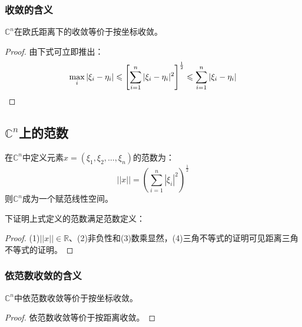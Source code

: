 \subsubsection{收敛的含义}
\begin{theorem}
	$\mathbb{C}^{n}$在欧氏距离下的收敛等价于按坐标收敛。
\end{theorem}
\begin{proof}
	由下式可立即推出：
	\begin{equation*}
		\max_i|\xi_i-\eta_i|\leqslant	\left[\sum_{i=1}^n|\xi_i-\eta_i|^2\right]^{\frac{1}{2}}\leqslant\sum_{i=1}^{n}|\xi_i-\eta_i|\qedhere
	\end{equation*}
\end{proof}

\subsection{$\mathbb{C}^n$上的范数}
\begin{definition}
	在$\mathbb{C}^n$中定义元素$x=(\xi_1,\xi_2,\dots,\xi_n)$的范数为：
	\begin{equation*}
		||x||=\left(\sum_{i=1}^n|\xi_i|^2\right)^{\frac{1}{2}}
	\end{equation*}
	则$\mathbb{C}^n$成为一个赋范线性空间。
\end{definition}
下证明上式定义的范数满足范数定义：
\begin{proof}
	(1)$||x||\in\mathbb{R}$、(2)非负性和(3)数乘显然，(4)三角不等式的证明可见距离三角不等式的证明。
\end{proof}
\subsubsection{依范数收敛的含义}
\begin{theorem}
	$\mathbb{C}^{n}$中依范数收敛等价于按坐标收敛。
\end{theorem}
\begin{proof}
	依范数收敛等价于按距离收敛。
\end{proof}
